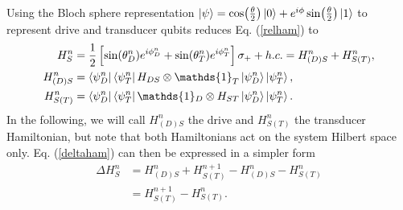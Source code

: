 Using the Bloch sphere representation $\ket{\psi} = \cos(\frac{\theta}{2}) \ket{0} + e^{i \phi} \sin(\frac{\theta}{2})\ket{1}$ to represent drive and transducer qubits reduces Eq. (\ref{relham}) to
\begin{align}
H_S^n &= \frac{1}{2} \left[\sin(\theta_D^n) e^{i\phi_D^n} + \sin(\theta_T^n) e^{i\phi_T^n}\right] \sigma_{+} + h.c. =  H_{(D)S}^n + H_{S(T)}^n, \nonumber \\
H_{(D)S}^n &= \bra{\psi_D^n} \bra{\psi_T^{n}} H_{DS} \otimes \mathds{1}_T \ket{\psi_D^n} \ket{\psi_T^n}, \nonumber \\
H_{S(T)}^n &= \bra{\psi_D^n} \bra{\psi_T^{n}} \mathds{1}_D \otimes H_{ST}  \ket{\psi_D^n} \ket{\psi_T^n}. \nonumber
\end{align}
In the following, we will call $H_{(D)S}^n$ the drive and $H_{S(T)}^n$ the transducer Hamiltonian, but note that both Hamiltonians act on the system Hilbert space only.
Eq. (\ref{deltaham}) can then be expressed in a simpler form
\begin{align}
\Delta H_S^n &= H_{(D)S}^{n} + H_{S(T)}^{n+1} - H_{(D)S}^{n} - H_{S(T)}^n \nonumber \\
 	&= H_{S(T)}^{n+1} - H_{S(T)}^n. \label{simpledeltaham}
\end{align}
